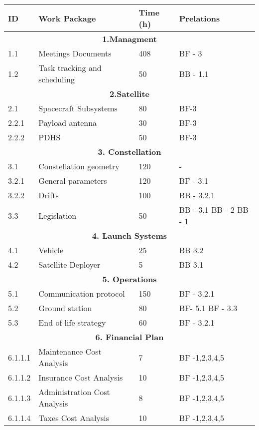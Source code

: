 \begin{longtable}{ | p{1.3cm} | p{7cm} | p{3cm} | p{3.5cm} |}
\hline

\textbf{ID }& \textbf{Work Package} & \textbf{Time (h)} & \textbf{Prelations} \\ \hline
\multicolumn{4}{|c|}{\textbf{1.Managment}} \\ \hline
1.1 & Meetings Documents & 408 & BF - 3 \\ \hline
1.2 & Task tracking and scheduling & 50 & BB - 1.1 \\ \hline
\multicolumn{4}{|c|}{\textbf{2.Satellite}} \\ \hline
2.1 & Spacecraft Subsystems & 80 & BF-3 \\ \hline
2.2.1 & Payload antenna & 30 & BF-3 \\ \hline
2.2.2 & PDHS & 50 & BF-3 \\ \hline
\multicolumn{4}{|c|}{\textbf{3. Constellation}} \\ \hline
3.1 & Constellation geometry & 120 & - \\ \hline
3.2.1 & General parameters & 120 & BF - 3.1 \\ \hline
3.2.2 & Drifts & 100 & BB - 3.2.1 \\ \hline
3.3 & Legislation & 50 & BB - 3.1 \newline
BB - 2 \newline 
BB - 1 \\ \hline
\multicolumn{4}{|c|}{\textbf{4. Launch Systems}} \\ \hline
4.1 & Vehicle & 25 & BB 3.2 \\ \hline
4.2 & Satellite Deployer & 5 & BB 3.1  \\ \hline
\multicolumn{4}{|c|}{\textbf{5. Operations}} \\ \hline
5.1 & Communication protocol & 150 & BF - 3.2.1 \\ \hline
5.2 & Ground station & 80 & BF- 5.1 \newline BF - 3.3 \\ \hline
5.3 & End of life strategy & 60 & BF - 3.2.1 \\
\hline
\multicolumn{4}{|c|}{\textbf{6. Financial Plan}} \\ \hline
6.1.1.1 & Maintenance Cost Analysis & 7 & BF -1,2,3,4,5 \\ \hline
6.1.1.2 & Insurance Cost Analysis & 10 & BF -1,2,3,4,5  \\ \hline
6.1.1.3 & Administration Cost Analysis & 8 & BF -1,2,3,4,5 \\ \hline
6.1.1.4 & Taxes Cost Analysis  & 10 & BF -1,2,3,4,5  \\ \hline

\end{longtable}
